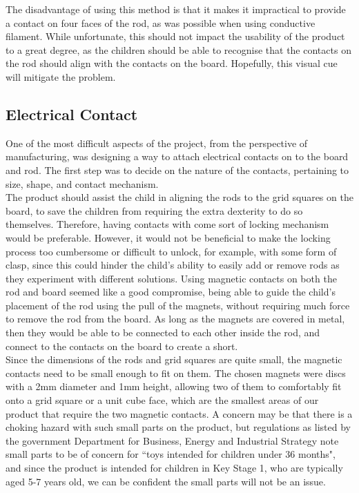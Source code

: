 The disadvantage of using this method is that it makes it impractical to provide a contact on four faces of the rod, as was possible when using conductive filament. While unfortunate, this should not impact the usability of the product to a great degree, as the children should be able to recognise that the contacts on the rod should align with the contacts on the board. Hopefully, this visual cue will mitigate the problem.


\subsection{Electrical Contact}
\label{sec:electrical_contact}
One of the most difficult aspects of the project, from the perspective of manufacturing, was designing a way to attach electrical contacts on to the board and rod. The first step was to decide on the nature of the contacts, pertaining to size, shape, and contact mechanism. \\

The product should assist the child in aligning the rods to the grid squares on the board, to save the children from requiring the extra dexterity to do so themselves. Therefore, having contacts with come sort of locking mechanism would be preferable. However, it would not be beneficial to make the locking process too cumbersome or difficult to unlock, for example, with some form of clasp, since this could hinder the child's ability to easily add or remove rods as they experiment with different solutions. Using magnetic contacts on both the rod and board seemed like a good compromise, being able to guide the child's placement of the rod using the pull of the magnets, without requiring much force to remove the rod from the board. As long as the magnets are covered in metal, then they would be able to be connected to each other inside the rod, and connect to the contacts on the board to create a short. \\

Since the dimensions of the rods and grid squares are quite small, the magnetic contacts need to be small enough to fit on them. The chosen magnets \cite{MagnetEx80:online} were discs with a 2mm diameter and 1mm height, allowing two of them to comfortably fit onto a grid square or a unit cube face, which are the smallest areas of our product that require the two magnetic contacts. A concern may be that there is a choking hazard with such small parts on the product, but regulations as listed by the government Department for Business, Energy and Industrial Strategy \cite{Products54:online} note small parts to be of concern for ``toys intended for children under 36 months", and since the product is intended for children in Key Stage 1, who are typically aged 5-7 years old, we can be confident the small parts will not be an issue. \\

